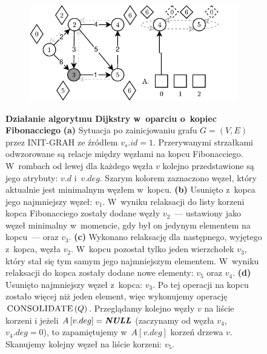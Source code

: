 \begin{figure}[!htbp]
\begin{subfigure}[b]{0.45\textwidth}
		\includegraphics[width=\textwidth]{Chapter_II/FIBONACCI-Example/d.pdf}
		\caption{}
	\end{subfigure}
	\caption{\textbf{Działanie algorytmu Dijkstry w~oparciu o~kopiec Fibonacciego} \textbf{(a)}  Sytuacja po zainicjowaniu grafu $G = \left( V, E \right)$ przez \textsf{INIT-GRAH} ze źródłem $v_{s}.id = 1$. Przerywanymi strzałkami odwzorowane są relacje między węzłami na kopcu Fibonacciego. W~rombach od lewej dla każdego węzła $v$ kolejno przedstawione są jego atrybuty: $v.d$ i~$v.deg$. Szarym kolorem zaznaczono węzeł, który aktualnie jest minimalnym węzłem w~kopcu. \textbf{(b)} Usunięto z~kopca jego najmniejszy węzeł: $v_{1}$. W~wyniku relaksacji do listy korzeni kopca Fibonacciego zostały dodane węzły $v_{2}$~--- ustawiony jako węzeł minimalny w~momencie, gdy był on jedynym elementem na kopcu~--- oraz $v_{3}$. \textbf{(c)} Wykonano relaksację dla następnego, wyjętego z~kopca, węzła $v_{2}$. W~kopcu pozostał tylko jeden wierzchołek $v_{3}$, który stał się tym samym jego najmniejszym elementem. W~wyniku relaksacji do kopca zostały dodane nowe elementy: $v_{5}$ oraz $v_{4}$. \textbf{(d)} Usunięto najmniejszy węzeł z~kopca: $v_{3}$. Po tej operacji na kopcu zostało więcej niż jeden element, więc wykonujemy operację $\textrm{\textsc{CONSOLIDATE}} \left( Q \right)$. Przeglądamy kolejno węzły $v$ na liście korzeni i jeżeli $A \left[ v.deg \right] = \emph{\textbf{NULL}} $ (zaczynamy od węzła $v_{4}$, $v_{4}.deg = 0$), to zapamiętujemy w~$A \left[ v.deg \right]$ korzeń drzewa $v$. Skanujemy kolejny węzeł na liście korzeni: $v_{5}$. } \label{fig:exampleFibonacci1}
\end{figure}
\newpage

